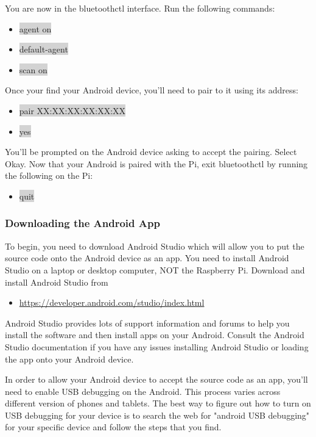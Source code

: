 \documentclass[12pt]{article}
\begin{document}
\noindent You are now in the bluetoothctl interface. Run the following commands:

\begin{itemize}
	\item[] \colorbox{lightgray}{agent on}
	\item[] \colorbox{lightgray}{default-agent}
	\item[] \colorbox{lightgray}{scan on}
\end{itemize}

\noindent Once your find your Android device, you'll need to pair to it using its address:

\begin{itemize} 	
	\item[] \colorbox{lightgray}{pair XX:XX:XX:XX:XX:XX} 
	\item[] \colorbox{lightgray}{yes}
\end{itemize}
	
\noindent You'll be prompted on the Android device asking to accept the pairing. Select Okay. Now that your Android is paired with the Pi, exit bluetoothctl by running the following on the Pi:
\begin{itemize}
	\item[] \colorbox{lightgray}{quit} 
\end{itemize}

\subsubsection{Downloading the Android App}

To begin, you need to download Android Studio which will allow you to put the source code onto the Android device as an app.  You need to install Android Studio on a laptop or desktop computer, NOT the Raspberry Pi.  Download and install Android Studio from 

\begin{itemize}
	\item \href{https://developer.android.com/studio/index.html}{https://developer.android.com/studio/index.html}
\end{itemize}

Android Studio provides lots of support information and forums to help you install the software and then install apps on your Android. Consult the Android Studio documentation if you have any issues installing Android Studio or loading the app onto your Android device.

\noindent In order to allow your Android device to accept the source code as an app, you'll need to enable USB debugging on the Android. This process varies across different version of phones and tablets. The best way to figure out how to turn on USB debugging for your device is to search the web for "android USB debugging" for your specific device and follow the steps that you find.
\end{document}
